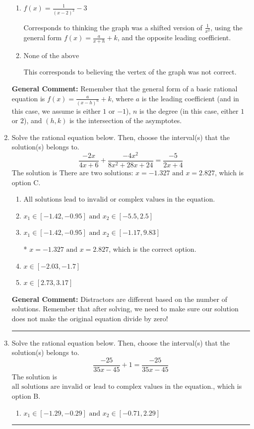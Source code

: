 \documentclass{extbook}[14pt]
\newcommand{\litem}[1]{\item #1

\rule{\textwidth}{0.4pt}}
\begin{document}
\begin{enumerate}
{\begin{enumerate}[label=\Alph*.]
Corresponds to using the general form $f(x) = \frac{a}{x+h}+k$ and the opposite leading coefficient.
\item \( f(x) = \frac{1}{(x - 2)^2} - 3 \)

Corresponds to thinking the graph was a shifted version of $\frac{1}{x^2}$, using the general form $f(x) = \frac{a}{x+h}+k$, and the opposite leading coefficient.
\item \( \text{None of the above} \)

This corresponds to believing the vertex of the graph was not correct.
\end{enumerate}

\textbf{General Comment:} Remember that the general form of a basic rational equation is $ f(x) = \frac{a}{(x-h)^n} + k$, where $a$ is the leading coefficient (and in this case, we assume is either $1$ or $-1$), $n$ is the degree (in this case, either $1$ or $2$), and $(h, k)$ is the intersection of the asymptotes.
}
\litem{
Solve the rational equation below. Then, choose the interval(s) that the solution(s) belongs to.
\[ \frac{-2x}{4x + 6} + \frac{-4x^{2}}{8x^{2} +28 x + 24} = \frac{-5}{2x + 4} \]The solution is \( \text{There are two solutions: } x = -1.327 \text{ and } x = 2.827 \), which is option C.\begin{enumerate}[label=\Alph*.]
\item \( \text{All solutions lead to invalid or complex values in the equation.} \)


\item \( x_1 \in [-1.42, -0.95] \text{ and } x_2 \in [-5.5,2.5] \)


\item \( x_1 \in [-1.42, -0.95] \text{ and } x_2 \in [-1.17,9.83] \)

* $x = -1.327 \text{ and } x = 2.827$, which is the correct option.
\item \( x \in [-2.03,-1.7] \)


\item \( x \in [2.73,3.17] \)


\end{enumerate}

\textbf{General Comment:} Distractors are different based on the number of solutions. Remember that after solving, we need to make sure our solution does not make the original equation divide by zero!
}
\litem{
Solve the rational equation below. Then, choose the interval(s) that the solution(s) belongs to.
\[ \frac{-25}{35x -45} + 1 = \frac{-25}{35x -45} \]The solution is \( \text{all solutions are invalid or lead to complex values in the equation.} \), which is option B.\begin{enumerate}[label=\Alph*.]
\item \( x_1 \in [-1.29, -0.29] \text{ and } x_2 \in [-0.71,2.29] \)


\end{enumerate}}
\end{enumerate}
\end{document}
